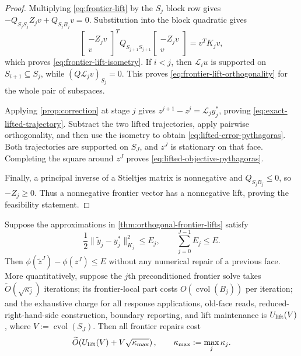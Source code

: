 \begin{proof}
Multiplying \cref{eq:frontier-lift} by the $S_j$ block row gives
$-Q_{S_jS_j}Z_jv+Q_{S_jB_j}v=0$.  Substitution into the block quadratic gives
\begin{equation*}
 \begin{bmatrix}-Z_jv\\v\end{bmatrix}^{\!T}
 Q_{S_{j+1}S_{j+1}}
 \begin{bmatrix}-Z_jv\\v\end{bmatrix}
 =v^TK_jv,
\end{equation*}
which proves \cref{eq:frontier-lift-isometry}.  If $i<j$, then
$\mathcal L_i u$ is supported on $S_{i+1}\subseteq S_j$, while
$(Q\mathcal L_jv)_{S_j}=0$.  This proves
\cref{eq:frontier-lift-orthogonality} for the whole pair of subspaces.

Applying \cref{prop:correction} at stage $j$ gives
$z^{j+1}-z^j=\mathcal L_jy_j^*$, proving
\cref{eq:exact-lifted-trajectory}.  Subtract the two lifted trajectories,
apply pairwise orthogonality, and then use the isometry to obtain
\cref{eq:lifted-error-pythagoras}.  Both trajectories are supported on
$S_J$, and $z^J$ is stationary on that face.  Completing the square around
$z^J$ proves \cref{eq:lifted-objective-pythagoras}.

Finally, a principal inverse of a Stieltjes matrix is nonnegative and
$Q_{S_jB_j}\leq0$, so $-Z_j\geq0$.  Thus a nonnegative frontier vector has a
nonnegative lift, proving the feasibility statement.
\end{proof}

\begin{corollary}
\label{cor:no-restart-frontier-work}
Suppose the approximations in \cref{thm:orthogonal-frontier-lifts} satisfy
\begin{equation}
 \frac12\|\widetilde y_j-y_j^*\|_{K_j}^2\leq E_j,
 \qquad
 \sum_{j=0}^{J-1}E_j\leq E.
 \label{eq:frontier-error-budget}
\end{equation}
Then $\phi(\widetilde z^J)-\phi(z^J)\leq E$ without any numerical repair of a
previous face.  More quantitatively, suppose the $j$th preconditioned
frontier solve takes
$\widetilde O(\sqrt{\kappa_j})$ iterations; its frontier-local part costs
$O(\operatorname{cvol}(B_j))$ per iteration; and the exhaustive charge for
all response applications, old-face reads, reduced-right-hand-side
construction, boundary reporting, and lift maintenance is $U_{\rm lift}(V)$,
where $V:=\operatorname{cvol}(S_J)$.  Then all frontier repairs cost
\begin{equation}
 \widetilde O\!\left(
 U_{\rm lift}(V)+V\sqrt{\kappa_{\max}}
 \right),
 \qquad
 \kappa_{\max}:=\max_j\kappa_j.
 \label{eq:no-restart-frontier-work}
\end{equation}
\end{corollary}

